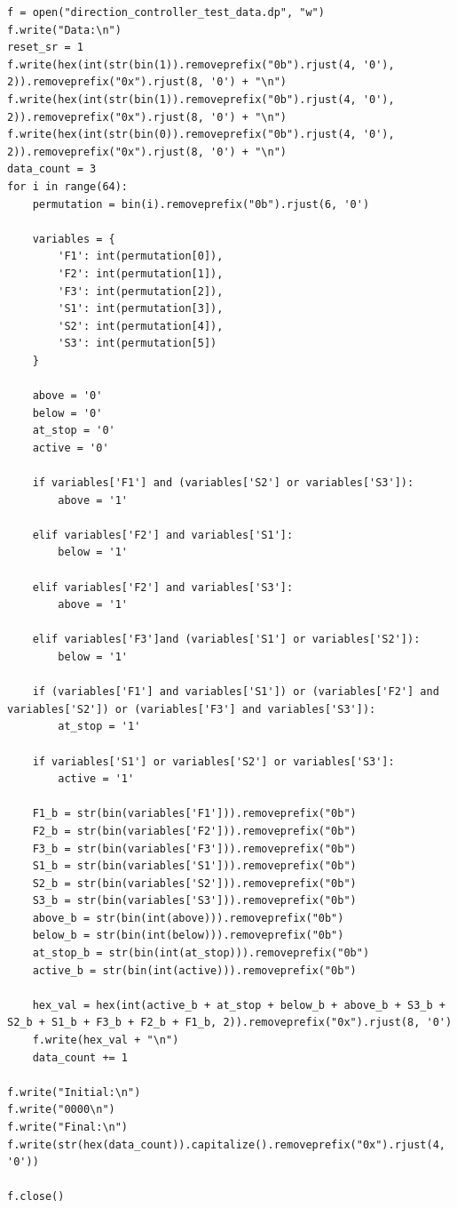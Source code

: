 \documentclass[a4paper]{article}
\begin{document}
\begin{verbatim}
f = open("direction_controller_test_data.dp", "w")
f.write("Data:\n")
reset_sr = 1
f.write(hex(int(str(bin(1)).removeprefix("0b").rjust(4, '0'), 2)).removeprefix("0x").rjust(8, '0') + "\n")
f.write(hex(int(str(bin(1)).removeprefix("0b").rjust(4, '0'), 2)).removeprefix("0x").rjust(8, '0') + "\n")
f.write(hex(int(str(bin(0)).removeprefix("0b").rjust(4, '0'), 2)).removeprefix("0x").rjust(8, '0') + "\n")
data_count = 3
for i in range(64):
    permutation = bin(i).removeprefix("0b").rjust(6, '0')
    
    variables = {
        'F1': int(permutation[0]),
        'F2': int(permutation[1]),
        'F3': int(permutation[2]),
        'S1': int(permutation[3]),
        'S2': int(permutation[4]),
        'S3': int(permutation[5])
    }

    above = '0'
    below = '0'
    at_stop = '0'
    active = '0'

    if variables['F1'] and (variables['S2'] or variables['S3']):
        above = '1'
    
    elif variables['F2'] and variables['S1']:
        below = '1'

    elif variables['F2'] and variables['S3']:
        above = '1'
    
    elif variables['F3']and (variables['S1'] or variables['S2']):
        below = '1'

    if (variables['F1'] and variables['S1']) or (variables['F2'] and variables['S2']) or (variables['F3'] and variables['S3']):
        at_stop = '1'

    if variables['S1'] or variables['S2'] or variables['S3']:
        active = '1'

    F1_b = str(bin(variables['F1'])).removeprefix("0b")
    F2_b = str(bin(variables['F2'])).removeprefix("0b")
    F3_b = str(bin(variables['F3'])).removeprefix("0b")
    S1_b = str(bin(variables['S1'])).removeprefix("0b")
    S2_b = str(bin(variables['S2'])).removeprefix("0b")
    S3_b = str(bin(variables['S3'])).removeprefix("0b")
    above_b = str(bin(int(above))).removeprefix("0b")
    below_b = str(bin(int(below))).removeprefix("0b")
    at_stop_b = str(bin(int(at_stop))).removeprefix("0b")
    active_b = str(bin(int(active))).removeprefix("0b")

    hex_val = hex(int(active_b + at_stop + below_b + above_b + S3_b + S2_b + S1_b + F3_b + F2_b + F1_b, 2)).removeprefix("0x").rjust(8, '0')
    f.write(hex_val + "\n")
    data_count += 1

f.write("Initial:\n")
f.write("0000\n")
f.write("Final:\n")
f.write(str(hex(data_count)).capitalize().removeprefix("0x").rjust(4, '0'))

f.close()
\end{verbatim}
\end{document}
